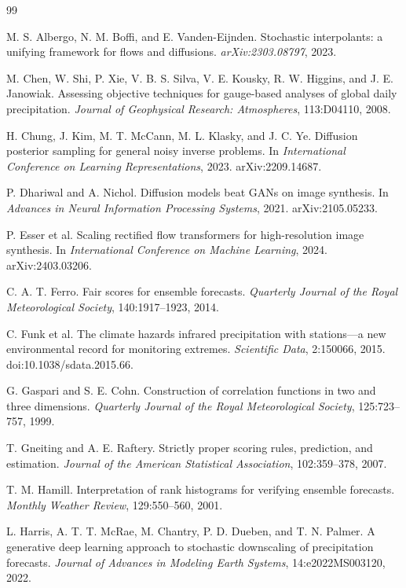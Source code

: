 \documentclass[10pt,twocolumn]{article}
\begin{document}
\begin{thebibliography}{99}

M. S. Albergo, N. M. Boffi, and E. Vanden-Eijnden.
Stochastic interpolants: a unifying framework for flows and diffusions.
\emph{arXiv:2303.08797}, 2023.

M. Chen, W. Shi, P. Xie, V. B. S. Silva, V. E. Kousky, R. W. Higgins, and J. E. Janowiak.
Assessing objective techniques for gauge-based analyses of global daily precipitation.
\emph{Journal of Geophysical Research: Atmospheres}, 113:D04110, 2008.

H. Chung, J. Kim, M. T. McCann, M. L. Klasky, and J. C. Ye.
Diffusion posterior sampling for general noisy inverse problems.
In \emph{International Conference on Learning Representations}, 2023.
arXiv:2209.14687.

P. Dhariwal and A. Nichol.
Diffusion models beat GANs on image synthesis.
In \emph{Advances in Neural Information Processing Systems}, 2021.
arXiv:2105.05233.

P. Esser et al.
Scaling rectified flow transformers for high-resolution image synthesis.
In \emph{International Conference on Machine Learning}, 2024.
arXiv:2403.03206.

C. A. T. Ferro.
Fair scores for ensemble forecasts.
\emph{Quarterly Journal of the Royal Meteorological Society}, 140:1917--1923, 2014.

C. Funk et al.
The climate hazards infrared precipitation with stations---a new environmental record for monitoring extremes.
\emph{Scientific Data}, 2:150066, 2015.
doi:10.1038/sdata.2015.66.

G. Gaspari and S. E. Cohn.
Construction of correlation functions in two and three dimensions.
\emph{Quarterly Journal of the Royal Meteorological Society}, 125:723--757, 1999.

T. Gneiting and A. E. Raftery.
Strictly proper scoring rules, prediction, and estimation.
\emph{Journal of the American Statistical Association}, 102:359--378, 2007.

T. M. Hamill.
Interpretation of rank histograms for verifying ensemble forecasts.
\emph{Monthly Weather Review}, 129:550--560, 2001.

L. Harris, A. T. T. McRae, M. Chantry, P. D. Dueben, and T. N. Palmer.
A generative deep learning approach to stochastic downscaling of precipitation forecasts.
\emph{Journal of Advances in Modeling Earth Systems}, 14:e2022MS003120, 2022.


\end{thebibliography}
\end{document}
